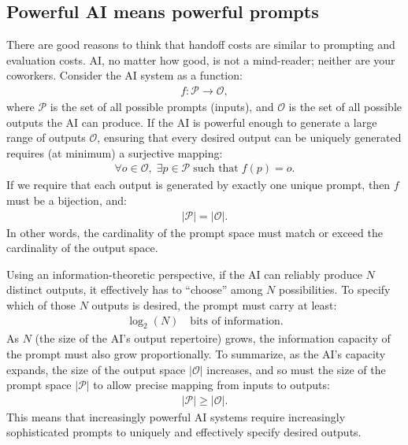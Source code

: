 \documentclass{article}
\theoremstyle{plain}
\theoremstyle{plain}
\begin{document}
\subsection{Powerful AI means powerful prompts}
There are good reasons to think that handoff costs are similar to prompting and evaluation costs.
AI, no matter how good, is not a mind-reader; neither are your coworkers.
Consider the AI system as a function:
\begin{align}
f : \mathcal{P} \longrightarrow \mathcal{O},
\end{align}
where \(\mathcal{P}\) is the set of all possible prompts (inputs), and \(\mathcal{O}\) is the set of all possible outputs the AI can produce.
If the AI is powerful enough to generate a large range of outputs \(\mathcal{O}\), ensuring that every desired output can be uniquely generated requires (at minimum) a surjective mapping:
\begin{align}
\forall o \in \mathcal{O}, \; \exists p \in \mathcal{P} \; \text{such that} \; f(p) = o.
\end{align}
If we require that each output is generated by exactly one unique prompt, then \(f\) must be a bijection, and:
\begin{align}
|\mathcal{P}| = |\mathcal{O}|.
\end{align}
In other words, the cardinality of the prompt space must match or exceed the cardinality of the output space.

Using an information-theoretic perspective, if the AI can reliably produce \(N\) distinct outputs, it effectively has to “choose” among \(N\) possibilities. 
To specify which of those \(N\) outputs is desired, the prompt must carry at least:
\begin{align}
\log_2(N) \quad \text{bits of information.}
\end{align}
As \(N\) (the size of the AI's output repertoire) grows, the information capacity of the prompt must also grow proportionally.
To summarize, as the AI’s capacity expands, the size of the output space \(|\mathcal{O}|\) increases, and so must the size of the prompt space \(|\mathcal{P}|\) to allow precise mapping from inputs to outputs:
\begin{align}
|\mathcal{P}| \geq |\mathcal{O}|.
\end{align}
This means that increasingly powerful AI systems require increasingly sophisticated prompts to uniquely and effectively specify desired outputs.




\end{document}
